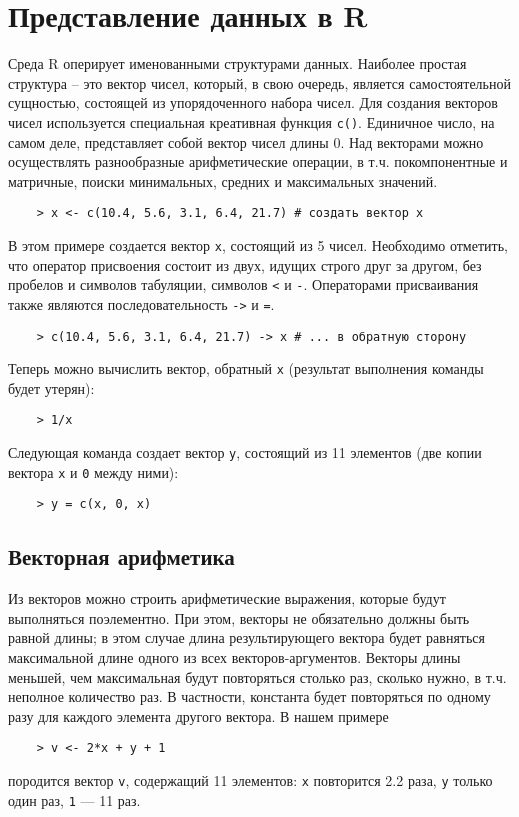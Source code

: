 \documentclass[12pt, openany, twoside]{book} %
\begin{document}
\section{Представление данных в R}
Среда R оперирует именованными структурами данных. Наиболее простая структура – это вектор чисел, который, в свою очередь, является самостоятельной сущностью, состоящей из упорядоченного набора чисел. Для создания векторов чисел используется специальная креативная функция \texttt{c()}. Единичное число, на самом деле, представляет собой вектор чисел длины 0. Над векторами можно осуществлять разнообразные арифметические операции, в т.ч. покомпонентные и матричные, поиски минимальных, средних и максимальных значений.
{\tt\begin{verbatim}
	> x <- c(10.4, 5.6, 3.1, 6.4, 21.7)	# создать вектор x
\end{verbatim}}
В этом примере создается вектор \texttt{x}, состоящий из 5 чисел. Необходимо отметить, что оператор присвоения состоит из двух, идущих строго друг за другом, без пробелов и символов табуляции, символов \texttt{<} и \texttt{-}. Операторами присваивания также являются последовательность \texttt{->} и \texttt{=}.
{\tt\begin{verbatim}
	> c(10.4, 5.6, 3.1, 6.4, 21.7) -> x	# ... в обратную сторону
\end{verbatim}}
Теперь можно вычислить вектор, обратный \texttt{x} (результат выполнения команды будет утерян):
{\tt\begin{verbatim}
	> 1/x
\end{verbatim}}
Следующая команда создает вектор \texttt{y}, состоящий из 11 элементов (две копии вектора \texttt{x} и \texttt{0} между ними):
{\tt\begin{verbatim}
	> y = c(x, 0, x)
\end{verbatim}}

\subsection{Векторная арифметика}
Из векторов можно строить арифметические выражения, которые будут выполняться поэлементно. При этом, векторы не обязательно должны быть равной длины; в этом случае длина результирующего вектора будет равняться максимальной длине одного из всех векторов-аргументов. Векторы длины меньшей, чем максимальная будут повторяться столько раз, сколько нужно, в т.ч. неполное количество раз. В частности, константа будет повторяться по одному разу для каждого элемента другого вектора. В нашем примере
{\tt\begin{verbatim}
	> v <- 2*x + y + 1
\end{verbatim}}
породится вектор \texttt{v}, содержащий 11 элементов: \texttt{x} повторится 2.2 раза, \texttt{y} только один раз, \texttt{1} --- 11 раз.
\end{document}

